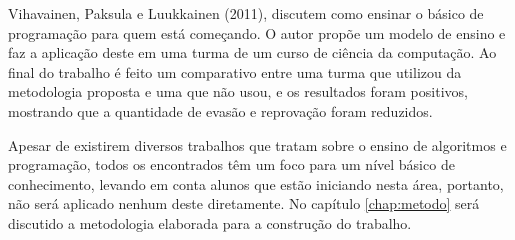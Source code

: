 \nocite{Vihavainen:2011:EAM:1953163.1953196}
Vihavainen, Paksula e Luukkainen (2011), discutem como ensinar o básico de programação para quem está começando. O autor propõe um modelo de ensino e faz a aplicação deste em uma turma de um curso de ciência da computação. Ao final do trabalho é feito um comparativo entre uma turma que utilizou da metodologia proposta e uma que não usou, e os resultados foram positivos, mostrando que a quantidade de evasão e reprovação foram reduzidos.

Apesar de existirem diversos trabalhos que tratam sobre o ensino de algoritmos e programação, todos os encontrados têm um foco para um nível básico de conhecimento, levando em conta alunos que estão iniciando nesta área, portanto, não será aplicado nenhum deste diretamente. No capítulo \ref{chap:metodo} será discutido a metodologia elaborada para a construção do trabalho.
 



